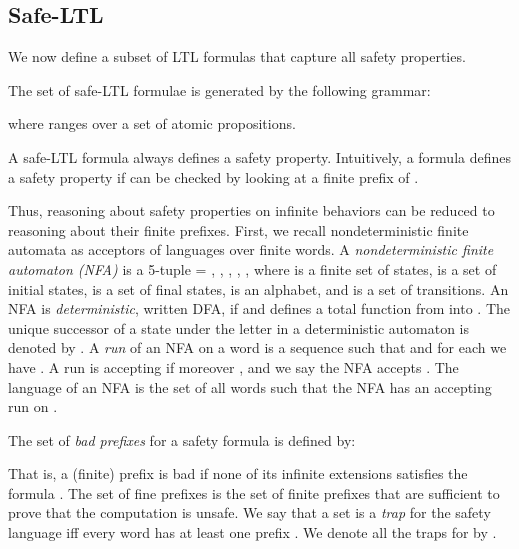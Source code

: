 
\subsection{Safe-LTL}

We now define a subset of LTL formulas that capture all safety properties.

\begin{definition}
The set of safe-LTL formulae is generated by the following grammar:

where  ranges over a set  of atomic propositions.
\end{definition}


\begin{figure*}[htb]
\centering
{}
\label{fig:pwq}
\caption[optional]{}
\end{figure*}

A safe-LTL formula always defines a safety property. 
Intuitively, a formula  defines a safety property if  can 
be checked by looking at a finite prefix of .

Thus, reasoning about safety properties on infinite behaviors can be reduced to reasoning
about their finite prefixes.
First, we recall nondeterministic finite automata as acceptors of languages over finite words.
A \emph{nondeterministic finite automaton (NFA)} is a 5-tuple 
 = , , , , ,
where  is a finite set of states,  is a set of initial states, 
is a set of final states,  is an alphabet, and  is a set of transitions.
An NFA is \emph{deterministic}, written DFA, if  and  defines a total function
from  into . 
The unique successor of a state  under the letter  
in a deterministic automaton is denoted by . A {\em run} of an NFA on a word 
is a sequence  such that  and
for each  we have .
A run is accepting if moreover , and we say the NFA accepts .
The language of an NFA is the set of all words  such that the NFA has an accepting run on .


The set of \emph{bad prefixes} for a safety formula  is defined by:

That is, a (finite) prefix  is bad if none of its infinite extensions  
satisfies the formula .
The set of fine prefixes is the set of finite prefixes that are sufficient to prove that the computation is unsafe.
We say that a set  is a \emph{trap} for the safety language  iff
every word  has at least one prefix .  
We denote all the traps for  by .

